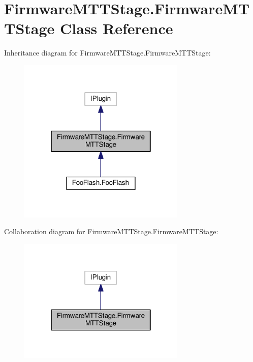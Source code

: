 \hypertarget{class_firmware_m_t_t_stage_1_1_firmware_m_t_t_stage}{\section{Firmware\-M\-T\-T\-Stage.\-Firmware\-M\-T\-T\-Stage Class Reference}
\label{class_firmware_m_t_t_stage_1_1_firmware_m_t_t_stage}
}


Inheritance diagram for Firmware\-M\-T\-T\-Stage.\-Firmware\-M\-T\-T\-Stage\-:
\nopagebreak
\begin{figure}[H]
\begin{center}
\leavevmode
\includegraphics[width=226pt]{class_firmware_m_t_t_stage_1_1_firmware_m_t_t_stage__inherit__graph}
\end{center}
\end{figure}


Collaboration diagram for Firmware\-M\-T\-T\-Stage.\-Firmware\-M\-T\-T\-Stage\-:
\nopagebreak
\begin{figure}[H]
\begin{center}
\leavevmode
\includegraphics[width=226pt]{class_firmware_m_t_t_stage_1_1_firmware_m_t_t_stage__coll__graph}
\end{center}
\end{figure}
